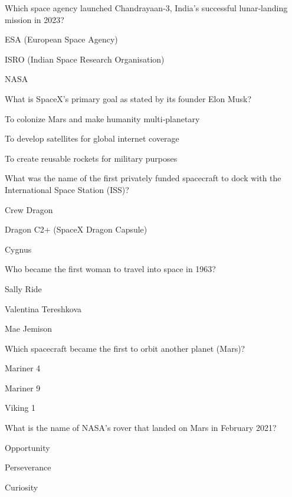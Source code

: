 \begin{enhancedmcq}{Which space agency launched Chandrayaan‑3, India's successful lunar‑landing mission in 2023?}
\item ESA (European Space Agency)
\item ISRO (Indian Space Research Organisation)
\item NASA

\end{enhancedmcq}
\begin{enhancedmcq}{What is SpaceX's primary goal as stated by its founder Elon Musk?}
\item To colonize Mars and make humanity multi‑planetary
\item To develop satellites for global internet coverage
\item To create reusable rockets for military purposes

\end{enhancedmcq}
\begin{enhancedmcq}{What was the name of the first privately funded spacecraft to dock with the International Space Station (ISS)?}
\item Crew Dragon
\item Dragon C2+ (SpaceX Dragon Capsule)
\item Cygnus

\end{enhancedmcq}
\begin{enhancedmcq}{Who became the first woman to travel into space in 1963?}
\item Sally Ride
\item Valentina Tereshkova
\item Mae Jemison

\end{enhancedmcq}
\begin{enhancedmcq}{Which spacecraft became the first to orbit another planet (Mars)?}
\item Mariner 4
\item Mariner 9
\item Viking 1

\end{enhancedmcq}
\begin{enhancedmcq}{What is the name of NASA's rover that landed on Mars in February 2021?}
\item Opportunity
\item Perseverance
\item Curiosity

\end{enhancedmcq}
